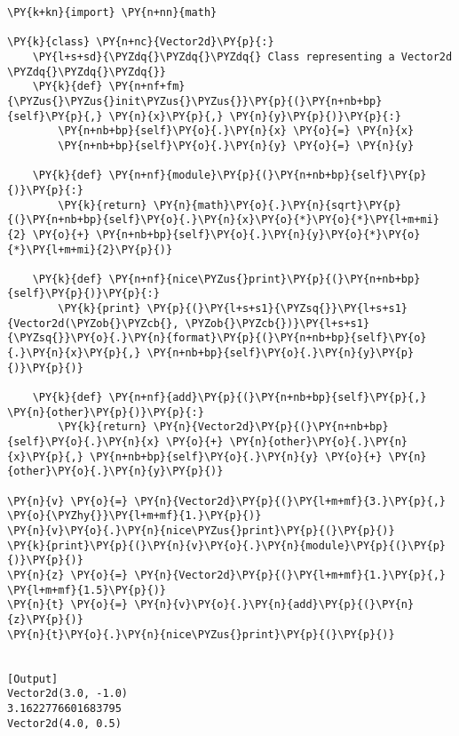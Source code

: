 \begin{Verbatim}[label=\makebox{\url{https://bitbucket.org/lbaldini/programming/src/tip/snippets/vector2d\_1.py}},commandchars=\\\{\}]
\PY{k+kn}{import} \PY{n+nn}{math}

\PY{k}{class} \PY{n+nc}{Vector2d}\PY{p}{:}
    \PY{l+s+sd}{\PYZdq{}\PYZdq{}\PYZdq{} Class representing a Vector2d \PYZdq{}\PYZdq{}\PYZdq{}}   
    \PY{k}{def} \PY{n+nf+fm}{\PYZus{}\PYZus{}init\PYZus{}\PYZus{}}\PY{p}{(}\PY{n+nb+bp}{self}\PY{p}{,} \PY{n}{x}\PY{p}{,} \PY{n}{y}\PY{p}{)}\PY{p}{:}
        \PY{n+nb+bp}{self}\PY{o}{.}\PY{n}{x} \PY{o}{=} \PY{n}{x}
        \PY{n+nb+bp}{self}\PY{o}{.}\PY{n}{y} \PY{o}{=} \PY{n}{y}
   
    \PY{k}{def} \PY{n+nf}{module}\PY{p}{(}\PY{n+nb+bp}{self}\PY{p}{)}\PY{p}{:}
        \PY{k}{return} \PY{n}{math}\PY{o}{.}\PY{n}{sqrt}\PY{p}{(}\PY{n+nb+bp}{self}\PY{o}{.}\PY{n}{x}\PY{o}{*}\PY{o}{*}\PY{l+m+mi}{2} \PY{o}{+} \PY{n+nb+bp}{self}\PY{o}{.}\PY{n}{y}\PY{o}{*}\PY{o}{*}\PY{l+m+mi}{2}\PY{p}{)}
       
    \PY{k}{def} \PY{n+nf}{nice\PYZus{}print}\PY{p}{(}\PY{n+nb+bp}{self}\PY{p}{)}\PY{p}{:}
        \PY{k}{print} \PY{p}{(}\PY{l+s+s1}{\PYZsq{}}\PY{l+s+s1}{Vector2d(\PYZob{}\PYZcb{}, \PYZob{}\PYZcb{})}\PY{l+s+s1}{\PYZsq{}}\PY{o}{.}\PY{n}{format}\PY{p}{(}\PY{n+nb+bp}{self}\PY{o}{.}\PY{n}{x}\PY{p}{,} \PY{n+nb+bp}{self}\PY{o}{.}\PY{n}{y}\PY{p}{)}\PY{p}{)}
   
    \PY{k}{def} \PY{n+nf}{add}\PY{p}{(}\PY{n+nb+bp}{self}\PY{p}{,} \PY{n}{other}\PY{p}{)}\PY{p}{:}
        \PY{k}{return} \PY{n}{Vector2d}\PY{p}{(}\PY{n+nb+bp}{self}\PY{o}{.}\PY{n}{x} \PY{o}{+} \PY{n}{other}\PY{o}{.}\PY{n}{x}\PY{p}{,} \PY{n+nb+bp}{self}\PY{o}{.}\PY{n}{y} \PY{o}{+} \PY{n}{other}\PY{o}{.}\PY{n}{y}\PY{p}{)}
       
\PY{n}{v} \PY{o}{=} \PY{n}{Vector2d}\PY{p}{(}\PY{l+m+mf}{3.}\PY{p}{,} \PY{o}{\PYZhy{}}\PY{l+m+mf}{1.}\PY{p}{)}
\PY{n}{v}\PY{o}{.}\PY{n}{nice\PYZus{}print}\PY{p}{(}\PY{p}{)}
\PY{k}{print}\PY{p}{(}\PY{n}{v}\PY{o}{.}\PY{n}{module}\PY{p}{(}\PY{p}{)}\PY{p}{)}
\PY{n}{z} \PY{o}{=} \PY{n}{Vector2d}\PY{p}{(}\PY{l+m+mf}{1.}\PY{p}{,} \PY{l+m+mf}{1.5}\PY{p}{)}
\PY{n}{t} \PY{o}{=} \PY{n}{v}\PY{o}{.}\PY{n}{add}\PY{p}{(}\PY{n}{z}\PY{p}{)}
\PY{n}{t}\PY{o}{.}\PY{n}{nice\PYZus{}print}\PY{p}{(}\PY{p}{)}
 

[Output]
Vector2d(3.0, -1.0)
3.1622776601683795
Vector2d(4.0, 0.5)
\end{Verbatim}